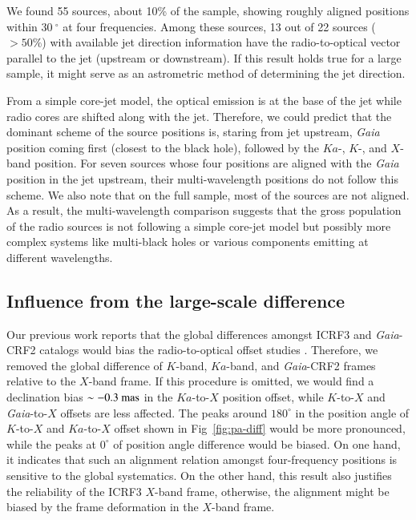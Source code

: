 \documentclass{aa}
\begin{document}
    We found 55 sources, about 10\% of the sample, showing roughly aligned positions within $30~^\circ$ at four frequencies.
    Among these sources, 13 out of 22 sources ($>50\%$) with available jet direction information have the radio-to-optical vector parallel to the jet (upstream or downstream).
    If this result holds true for a large sample, it might serve as an astrometric method of determining the jet direction.

    From a simple core-jet model, the optical emission is at the base of the jet while radio cores are shifted along with the jet.
    Therefore, we could predict that the dominant scheme of the source positions is, staring from jet upstream, \textit{Gaia} position coming first (closest to the black hole), followed by the $Ka$-, $K$-, and $X$-band position.
    For seven sources whose four positions are aligned with the \textit{Gaia} position in the jet upstream, their multi-wavelength positions do not follow this scheme.
    We also note that on the full sample, most of the sources are not aligned.
    As a result, the multi-wavelength comparison suggests that the gross population of the radio sources is not following a simple core-jet model but possibly more complex systems like multi-black holes or various components emitting at different wavelengths.


\subsection{Influence from the large-scale difference} \label{subsec:sys-effect}

    Our previous work reports that the global differences amongst ICRF3 and \textit{Gaia}-CRF2 catalogs would bias the radio-to-optical offset studies \citep{2020A&A...634A..28L}.
    Therefore, we removed the global difference of $K$-band, $Ka$-band, and \textit{Gaia}-CRF2 frames relative to the $X$-band frame.
    If this procedure is omitted, we would find a declination bias $\sim-0.3~{\rm mas}$ in the $Ka$-to-$X$ position offset, while $K$-to-$X$ and \textit{Gaia}-to-$X$ offsets are less affected.
    The peaks around $180^\circ$ in the position angle of $K$-to-$X$ and $Ka$-to-$X$ offset shown in Fig~\ref{fig:pa-diff} would be more pronounced, while the peaks at $0^\circ$ of position angle difference would be biased.
    On one hand, it indicates that such an alignment relation amongst four-frequency positions is sensitive to the global systematics.
    On the other hand, this result also justifies the reliability of the ICRF3 $X$-band frame, otherwise, the alignment might be biased by the frame deformation in the $X$-band frame.
\end{document}
